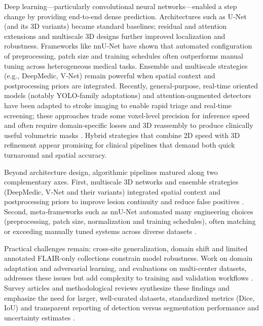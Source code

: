 \documentclass[12pt]{article}
\begin{document}
Deep learning—particularly convolutional neural networks—enabled a step change by providing end‑to‑end dense prediction. Architectures such as U‑Net (and its 3D variants) became standard baselines; residual and attention extensions and multiscale 3D designs further improved localization and robustness. Frameworks like nnU‑Net have shown that automated configuration of preprocessing, patch size and training schedules often outperforms manual tuning across heterogeneous medical tasks. Ensemble and multiscale strategies (e.g., DeepMedic, V‑Net) remain powerful when spatial context and postprocessing priors are integrated. Recently, general‑purpose, real‑time oriented models (notably YOLO‑family adaptations) and attention‑augmented detectors have been adapted to stroke imaging to enable rapid triage and real‑time screening; these approaches trade some voxel‑level precision for inference speed and often require domain‑specific losses and 3D reassembly to produce clinically useful volumetric masks \cite{chenAutomaticDetectionStroke2022,chenMSAYOLOv5MultiscaleAttentionbased2023,gheibiCNNResDeepLearning2023}. Hybrid strategies that combine 2D speed with 3D refinement appear promising for clinical pipelines that demand both quick turnaround and spatial accuracy. 

Beyond architecture design, algorithmic pipelines matured along two complementary axes. First, multiscale 3D networks and ensemble strategies (DeepMedic, V‑Net and their variants) integrated spatial context and postprocessing priors to improve lesion continuity and reduce false positives \cite{kamnitsasEfficientMultiscale3D2017,Milletari2016,liFullyConvolutionalNetwork2018}. Second, meta‑frameworks such as nnU‑Net automated many engineering choices (preprocessing, patch size, normalization and training schedules), often matching or exceeding manually tuned systems across diverse datasets \cite{Isensee2021,isenseeAbstractNnUNetSelfadapting2019}.

Practical challenges remain: cross‑site generalization, domain shift and limited annotated FLAIR‑only collections constrain model robustness. Work on domain adaptation and adversarial learning, and evaluations on multi‑center datasets, addresses these issues but add complexity to training and validation workflows \cite{Kamnitsas2017DA,Karani2018}. Survey articles and methodological reviews synthesize these findings and emphasize the need for larger, well‑curated datasets, standardized metrics (Dice, IoU) and transparent reporting of detection versus segmentation performance and uncertainty estimates \cite{Litjens2017,minaeeImageSegmentationUsing2021,liuReviewDeepLearningBasedMedical2021,TahaHanbury2015}.
\end{document}
